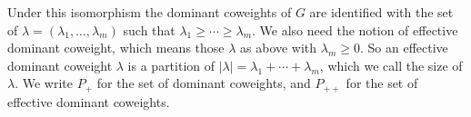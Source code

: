 \documentclass[draft]{article}
\begin{document}
Under this isomorphism the dominant coweights of $ G $ 
are identified with the set of $ \lambda = (\lambda_1, \dots, \lambda_m) $ such that $ \lambda_1 \ge \cdots \ge \lambda_m$. 
We also need the notion of effective dominant coweight, 
which means those $ \lambda $ as above with $ \lambda_m \ge 0$.  So an effective dominant coweight $ \lambda $ is a partition of $|\lambda| = \lambda_1 + \cdots + \lambda_m$, which we call the size of $ \lambda$. We write $P_+$ for the set of dominant coweights, and $P_{++}$ for the set of effective dominant coweights. 

% 

\end{document}
